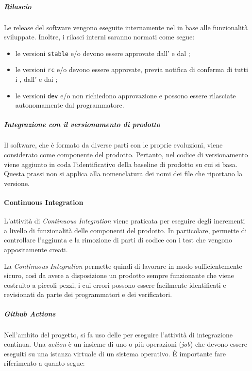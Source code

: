 		\subparagraph{Rilascio}

		Le release del software vengono eseguite internamente nel  in base alle funzionalità sviluppate. Inoltre, i rilasci interni saranno normati come segue:
		\begin{itemize}
			\item le versioni \verb!stable! e/o  devono essere approvate dall' e dal ;
			\item le versioni \verb!rc! e/o  devono essere approvate, previa notifica di conferma di tutti i , dall' e dai ;
			\item le versioni \verb!dev! e/o  non richiedono approvazione e possono essere rilasciate autonomamente dal programmatore.
		\end{itemize}

		\subparagraph{Integrazione con il versionamento di prodotto}

		Il software, che è formato da diverse parti con le proprie evoluzioni, viene considerato come componente del prodotto. Pertanto, nel codice di versionamento viene aggiunto in coda l'identificativo della baseline di prodotto su cui si basa. Questa prassi non si applica alla nomenclatura dei nomi dei file che riportano la versione.

	\paragraph{Continuous Integration}

	L'attività di \textit{Continuous Integration} viene praticata per eseguire degli incrementi a livello di funzionalità delle componenti del prodotto. In particolare, permette di controllare l'aggiunta e la rimozione di parti di codice con i test che vengono appositamente creati.

	La \textit{Continuous Integration} permette quindi di lavorare in modo sufficientemente sicuro, così da avere a disposizione un prodotto sempre funzionante che viene costruito a piccoli pezzi, i cui errori possono essere facilmente identificati e revisionati da parte dei programmatori e dei verificatori.

		\subparagraph{Github Actions}

		Nell'ambito del progetto, si fa uso delle  per eseguire l'attività di integrazione continua. Una \textit{action} è un insieme di uno o più operazioni (\textit{job}) che devono essere eseguiti su una istanza virtuale di un sistema operativo. È importante fare riferimento a quanto segue:

